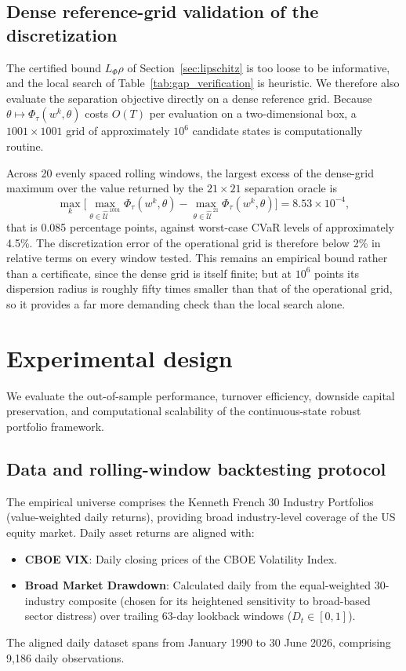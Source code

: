 \documentclass[smallcondensed]{svjour3}
\begin{document}
\subsection{Dense reference-grid validation of the discretization}
\label{sec:dense_grid}
The certified bound $L_\Phi \rho$ of Section~\ref{sec:lipschitz} is too loose
to be informative, and the local search of Table~\ref{tab:gap_verification} is
heuristic. We therefore also evaluate the separation objective directly on a
dense reference grid. Because $\theta \mapsto \Phi_\tau(w^k,\theta)$ costs
$O(T)$ per evaluation on a two-dimensional box, a $1001 \times 1001$ grid of
approximately $10^6$ candidate states is computationally routine.

Across 20 evenly spaced rolling windows, the largest excess of the dense-grid
maximum over the value returned by the $21\times21$ separation oracle is
\[
\max_k \Big[ \max_{\theta \in \widehat{\mathcal{U}}^{\,1001}} \Phi_\tau(w^k,\theta)
      - \max_{\theta \in \widehat{\mathcal{U}}^{\,21}} \Phi_\tau(w^k,\theta) \Big]
= 8.53 \times 10^{-4},
\]
that is 0.085 percentage points, against worst-case CVaR levels of
approximately 4.5\%. The discretization error of the operational grid is
therefore below 2\% in relative terms on every window tested. This remains an
empirical bound rather than a certificate, since the dense grid is itself
finite; but at $10^6$ points its dispersion radius is roughly fifty times
smaller than that of the operational grid, so it provides a far more
demanding check than the local search alone.

\section{Experimental design}\label{sec:experimental}
We evaluate the out-of-sample performance, turnover efficiency, downside capital preservation, and computational scalability of the continuous-state robust portfolio framework.

\subsection{Data and rolling-window backtesting protocol}
The empirical universe comprises the Kenneth French 30 Industry Portfolios \cite{french2026data} (value-weighted daily returns), providing broad industry-level coverage of the US equity market. Daily asset returns are aligned with:
\begin{itemize}
    \item \textbf{CBOE VIX}: Daily closing prices of the CBOE Volatility Index.
    \item \textbf{Broad Market Drawdown}: Calculated daily from the equal-weighted 30-industry composite (chosen for its heightened sensitivity to broad-based sector distress) over trailing 63-day lookback windows ($D_t \in [0, 1]$).
\end{itemize}
The aligned daily dataset spans from January 1990 to 30 June 2026, comprising 9,186 daily observations.
\end{document}
